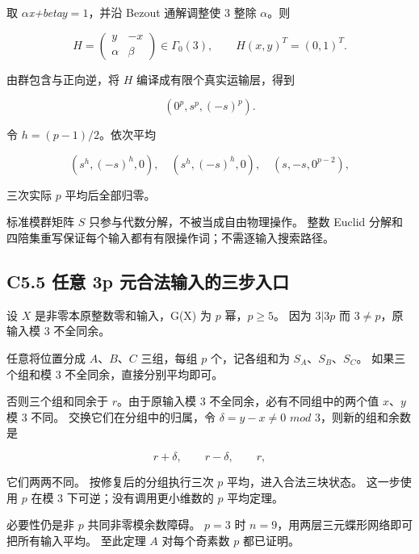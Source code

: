 {取} {\ensuremath{\alpha }}\emph{{x+beta}}{\ensuremath{y=1}，并沿} {Bezout} {通解调整使} {3} {整除} {\ensuremath{\alpha }。则}

\[
H=\begin{pmatrix}y&-x\\\alpha&\beta\end{pmatrix}\in\Gamma_0(3),
\qquad H(x,y)^T=(0,1)^T.
\]

{由群包含与正向逆，将} {\ensuremath{H}} {编译成有限个真实运输层，得到}

\[
(0^p,s^p,(-s)^p).
\]

{令} {\ensuremath{h=(p-1)/2}。依次平均}

\[
(s^h,(-s)^h,0),\quad
(s^h,(-s)^h,0),\quad
(s,-s,0^{p-2}),
\]

{三次实际} {\ensuremath{p}} {平均后全部归零。}

{标准模群矩阵} {\ensuremath{S}} {只参与代数分解，不被当成自由物理操作。} {整数} {Euclid} {分解和四陪集重写保证每个输入都有有限操作词；不需逐输入搜索路径。}

\subsection*{\texorpdfstring{{C5.5} {任意} {3p} {元合法输入的三步入口}}{C5.5 任意 3p 元合法输入的三步入口}}\label{C5-h32}

{设} {\ensuremath{X}} {是非零本原整数零和输入，G(X)} {为} {\ensuremath{p}} {幂，\ensuremath{p\ge 5}。} {因为} {\ensuremath{3|3p}} {而} {\ensuremath{3\ne p}，原输入模} {3} {不全同余。}

{任意将位置分成} {\ensuremath{A}、\ensuremath{B}、\ensuremath{C}} {三组，每组} {\ensuremath{p}} {个，记各组和为} {\ensuremath{S_{A}}、\ensuremath{S_{B}}、\ensuremath{S_{C}}。} {如果三个组和模} {3} {不全同余，直接分别平均即可。}

{否则三个组和同余于} {\ensuremath{r}。由于原输入模} {3} {不全同余，必有不同组中的两个值} {\ensuremath{x}、\ensuremath{y}} {模} {3} {不同。} {交换它们在分组中的归属，令} {\ensuremath{\delta =y-x\ne 0}} {\ensuremath{mod}} {3，则新的组和余数是}

\[
r+\delta,\qquad r-\delta,\qquad r,
\]

{它们两两不同。} {按修复后的分组执行三次} {\ensuremath{p}} {平均，进入合法三块状态。} {这一步使用} {\ensuremath{p}} {在模} {3} {下可逆；没有调用更小维数的} {\ensuremath{p}} {平均定理。}

{必要性仍是非} {\ensuremath{p}} {共同非零模余数障碍。} {\ensuremath{p=3}} {时} {\ensuremath{n=9}，用两层三元蝶形网络即可把所有输入平均。} {至此定理} {\ensuremath{A}} {对每个奇素数} {\ensuremath{p}} {都已证明。}

